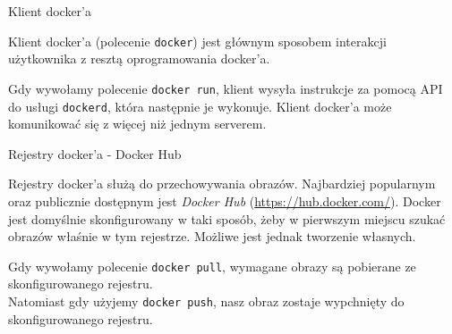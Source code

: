 \documentclass[aspectratio=169]{beamer}
\begin{document}
\begin{frame}{Klient docker'a}
    \begin{card}
        Klient docker'a (polecenie \colorbox{dark-gray}{\lstinline{docker}}) jest głównym sposobem interakcji użytkownika z resztą oprogramowania docker'a.
    \end{card}
    \begin{card}
        Gdy wywołamy polecenie \colorbox{dark-gray}{\lstinline{docker run}}, klient wysyła instrukcje za pomocą API do usługi  \colorbox{dark-gray}{\lstinline{dockerd}}, która następnie je wykonuje. Klient docker'a może komunikować się z więcej niż jednym serverem.

    \end{card}
\end{frame}

\begin{frame}{Rejestry docker'a - Docker Hub}
    \begin{card}
        Rejestry docker'a służą do przechowywania obrazów. Najbardziej popularnym oraz publicznie dostępnym jest \textit{Docker Hub} (\url{https://hub.docker.com/}).
        Docker jest domyślnie skonfigurowany w taki sposób, żeby w pierwszym miejscu szukać obrazów właśnie w tym rejestrze. Możliwe jest jednak tworzenie własnych.
    \end{card}
    \begin{card}
        Gdy wywołamy polecenie \colorbox{dark-gray}{\lstinline{docker pull}}, wymagane obrazy są pobierane ze skonfigurowanego rejestru.\\
        Natomiast gdy użyjemy \colorbox{dark-gray}{\lstinline{docker push}}, nasz obraz zostaje wypchnięty do skonfigurowanego rejestru.
    \end{card}
\end{frame}
\end{document}
